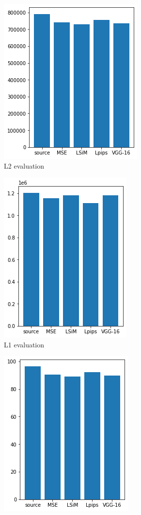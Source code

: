 \documentclass[a4paper,12pt,twoside]{report}
\begin{document}
\begin{figure}
	\centering
	\begin{subfigure}{0.32\textwidth}
		\centering
		\includegraphics[scale=0.49]{karmanflow/l2.png}
		\caption{L2 evaluation}
	\end{subfigure}
	\begin{subfigure}{0.32\textwidth}
		\centering
		\includegraphics[scale=0.49]{karmanflow/l1.png}
		\caption{L1 evaluation}
	\end{subfigure}
	\begin{subfigure}{0.32\textwidth}
		\centering
		\includegraphics[scale=0.49]{karmanflow/mse.png}

\end{subfigure}
\end{figure}
\end{document}
